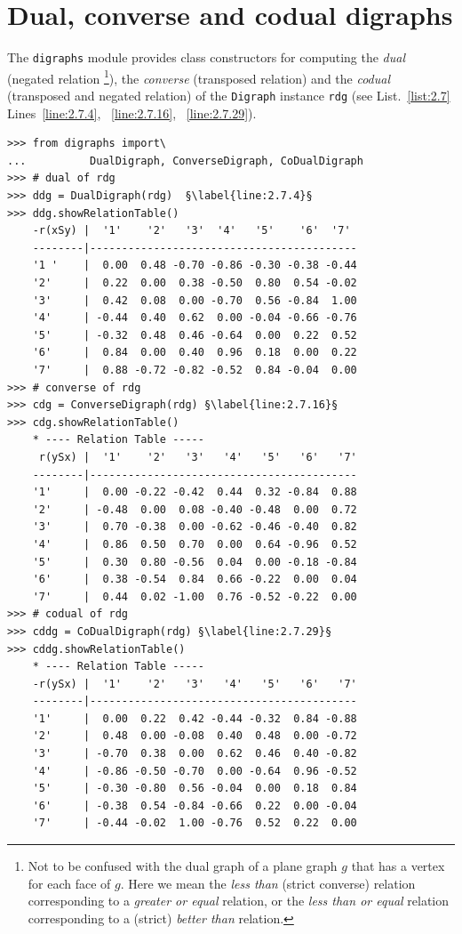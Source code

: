 \section{Dual, converse and codual digraphs}
\label{sec:2.6}

The \texttt{digraphs} module provides class constructors for computing the \emph{dual} (negated relation \footnote{Not to be confused with the dual graph of a plane graph $g$ that has a vertex for each face of $g$. Here we mean the \emph{less than} (strict converse) relation corresponding to a \emph{greater or equal} relation, or the \emph{less than or equal} relation corresponding to a (strict) \emph{better than} relation.}), the \emph{converse} (transposed relation) and the \emph{codual} (transposed and negated relation) of the \texttt{Digraph} instance \texttt{rdg} (see List.~\vref{list:2.7} Lines~\ref{line:2.7.4}, ~\ref{line:2.7.16}, ~\ref{line:2.7.29}). 
\begin{lstlisting}[caption={Computing associated dual, converse and codual digraphs},label=list:2.7]
>>> from digraphs import\
...          DualDigraph, ConverseDigraph, CoDualDigraph
>>> # dual of rdg
>>> ddg = DualDigraph(rdg)  §\label{line:2.7.4}§
>>> ddg.showRelationTable()
    -r(xSy) |  '1'    '2'   '3'  '4'   '5'    '6'  '7'	  
    --------|------------------------------------------
    '1 '    |  0.00  0.48 -0.70 -0.86 -0.30 -0.38 -0.44	 
    '2'     |  0.22  0.00  0.38 -0.50  0.80  0.54 -0.02	 
    '3'     |  0.42  0.08  0.00 -0.70  0.56 -0.84  1.00	 
    '4'     | -0.44  0.40  0.62  0.00 -0.04 -0.66 -0.76	 
    '5'     | -0.32  0.48  0.46 -0.64  0.00  0.22  0.52	 
    '6'     |  0.84  0.00  0.40  0.96  0.18  0.00  0.22	 
    '7'     |  0.88 -0.72 -0.82 -0.52  0.84 -0.04  0.00
>>> # converse of rdg
>>> cdg = ConverseDigraph(rdg) §\label{line:2.7.16}§
>>> cdg.showRelationTable()
    * ---- Relation Table -----
     r(ySx) |  '1'    '2'   '3'   '4'   '5'   '6'   '7'	  
    --------|------------------------------------------
    '1'     |  0.00 -0.22 -0.42  0.44  0.32 -0.84  0.88	 
    '2'     | -0.48  0.00  0.08 -0.40 -0.48  0.00  0.72	 
    '3'     |  0.70 -0.38  0.00 -0.62 -0.46 -0.40  0.82	 
    '4'     |  0.86  0.50  0.70  0.00  0.64 -0.96  0.52	 
    '5'     |  0.30  0.80 -0.56  0.04  0.00 -0.18 -0.84	 
    '6'     |  0.38 -0.54  0.84  0.66 -0.22  0.00  0.04	 
    '7'     |  0.44  0.02 -1.00  0.76 -0.52 -0.22  0.00	 
>>> # codual of rdg
>>> cddg = CoDualDigraph(rdg) §\label{line:2.7.29}§
>>> cddg.showRelationTable()
    * ---- Relation Table -----
    -r(ySx) |  '1'    '2'   '3'   '4'   '5'   '6'   '7'	    
    --------|------------------------------------------
    '1'     |  0.00  0.22  0.42 -0.44 -0.32  0.84 -0.88	 
    '2'     |  0.48  0.00 -0.08  0.40  0.48  0.00 -0.72	 
    '3'     | -0.70  0.38  0.00  0.62  0.46  0.40 -0.82	 
    '4'     | -0.86 -0.50 -0.70  0.00 -0.64  0.96 -0.52	 
    '5'     | -0.30 -0.80  0.56 -0.04  0.00  0.18  0.84	 
    '6'     | -0.38  0.54 -0.84 -0.66  0.22  0.00 -0.04	 
    '7'     | -0.44 -0.02  1.00 -0.76  0.52  0.22  0.00	 
\end{lstlisting}


